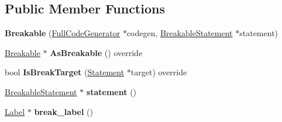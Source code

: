 \subsection*{Public Member Functions}
\begin{DoxyCompactItemize}
\item 
{\bfseries Breakable} (\hyperlink{classv8_1_1internal_1_1_full_code_generator}{Full\+Code\+Generator} $\ast$codegen, \hyperlink{classv8_1_1internal_1_1_breakable_statement}{Breakable\+Statement} $\ast$statement)\hypertarget{classv8_1_1internal_1_1_full_code_generator_1_1_breakable_aeb85a88605c83b4a3d1bc53f5d5f86a2}{}\label{classv8_1_1internal_1_1_full_code_generator_1_1_breakable_aeb85a88605c83b4a3d1bc53f5d5f86a2}

\item 
\hyperlink{classv8_1_1internal_1_1_full_code_generator_1_1_breakable}{Breakable} $\ast$ {\bfseries As\+Breakable} () override\hypertarget{classv8_1_1internal_1_1_full_code_generator_1_1_breakable_aeb7020547e7e285adb505d7ae692b5f5}{}\label{classv8_1_1internal_1_1_full_code_generator_1_1_breakable_aeb7020547e7e285adb505d7ae692b5f5}

\item 
bool {\bfseries Is\+Break\+Target} (\hyperlink{classv8_1_1internal_1_1_statement}{Statement} $\ast$target) override\hypertarget{classv8_1_1internal_1_1_full_code_generator_1_1_breakable_ab73c37383b482c2d2755e26434ab8f23}{}\label{classv8_1_1internal_1_1_full_code_generator_1_1_breakable_ab73c37383b482c2d2755e26434ab8f23}

\item 
\hyperlink{classv8_1_1internal_1_1_breakable_statement}{Breakable\+Statement} $\ast$ {\bfseries statement} ()\hypertarget{classv8_1_1internal_1_1_full_code_generator_1_1_breakable_a6412805874919074bda4988f8fc71643}{}\label{classv8_1_1internal_1_1_full_code_generator_1_1_breakable_a6412805874919074bda4988f8fc71643}

\item 
\hyperlink{classv8_1_1internal_1_1_label}{Label} $\ast$ {\bfseries break\+\_\+label} ()\hypertarget{classv8_1_1internal_1_1_full_code_generator_1_1_breakable_aedcf19cf8c1ae72e797965bce49ff727}{}\label{classv8_1_1internal_1_1_full_code_generator_1_1_breakable_aedcf19cf8c1ae72e797965bce49ff727}

\end{DoxyCompactItemize}
